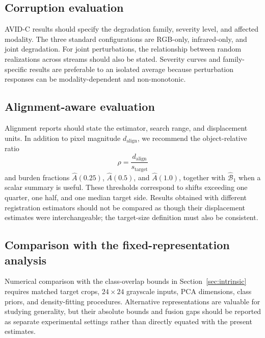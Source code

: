 \documentclass[10pt]{article}
\newcommand{\corrupt}{\textsc{AVID-C}}
\newcommand{\burden}{\widehat A}
\begin{document}
\subsection{Corruption evaluation}

\corrupt{} results should specify the degradation family, severity level, and affected modality. The three standard configurations are RGB-only, infrared-only, and joint degradation. For joint perturbations, the relationship between random realizations across streams should also be stated. Severity curves and family-specific results are preferable to an isolated average because perturbation responses can be modality-dependent and non-monotonic.

\subsection{Alignment-aware evaluation}

Alignment reports should state the estimator, search range, and displacement units. In addition to pixel magnitude $d_{\mathrm{align}}$, we recommend the object-relative ratio
\begin{equation}
\rho=\frac{d_{\mathrm{align}}}{s_{\mathrm{target}}}
\end{equation}
and burden fractions $\burden(0.25)$, $\burden(0.5)$, and $\burden(1.0)$, together with $\widehat{\mathcal B}_1$ when a scalar summary is useful. These thresholds correspond to shifts exceeding one quarter, one half, and one median target side. Results obtained with different registration estimators should not be compared as though their displacement estimates were interchangeable; the target-size definition must also be consistent.

\subsection{Comparison with the fixed-representation analysis}

Numerical comparison with the class-overlap bounds in Section~\ref{sec:intrinsic} requires matched target crops, $24\times24$ grayscale inputs, PCA dimensions, class priors, and density-fitting procedures. Alternative representations are valuable for studying generality, but their absolute bounds and fusion gaps should be reported as separate experimental settings rather than directly equated with the present estimates.
\end{document}
